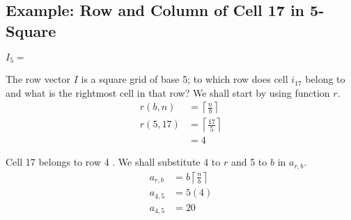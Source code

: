 \documentclass[letterpaper, twoside,12pt]{article}
\begin{document}
    \subsection{Example: Row and Column of Cell 17 in 5-Square}
    \label{1_example_1}
    \begin{figure*}[ht]
        \centering
        \setcounter{MaxMatrixCols}{25}
            \centering
            $I_5 =$
    \end{figure*}

    The row vector $I$ is a square grid of base 5; to which row does cell $i_{17}$ belong to and what is the rightmost cell in that row? We shall start by using function $r$.
    \begin{equation*}
        \begin{split}
            r(b,n) &= \left\lceil \frac{n}{b} \right\rceil \\
            r(5,17) &= \left\lceil \frac{17}{5} \right\rceil \\
                &= 4
        \end{split}
    \end{equation*}

    Cell 17 belongs to row 4 . We shall substitute 4 to $r$ and 5 to $b$ in $a_{r,b}$.
    \begin{equation*}
        \begin{split}
            a_{r,b} &= b\left\lceil \frac{n}{b} \right\rceil \\
            a_{4,5} &= 5(4) \\
            a_{4,5} &= 20 \\
        \end{split}
    \end{equation*}
\end{document}
